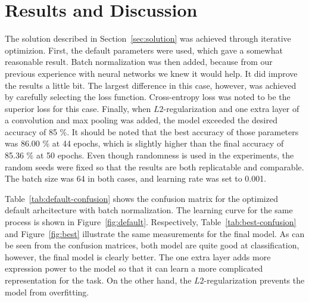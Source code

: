 \documentclass{article}
\begin{document}
\section{Results and Discussion}\label{sec:results}

The solution described in Section~\ref{sec:solution} was achieved
through iterative optimizion. First, the default parameters were used,
which gave a somewhat reasonable result. Batch normalization was then
added, because from our previous experience with neural networks we
knew it would help. It did improve the results a little bit. The
largest difference in this case, however, was achieved by carefully
selecting the loss function. Cross-entropy loss was noted to be the
superior loss for this case. Finally, when $L2$-regularization and one
extra layer of a convolution and max pooling was added, the model
exceeded the desired accuracy of 85 \%. It should be noted that the
best accuracy of those parameters was 86.00 \% at 44 epochs, which is
slightly higher than the final accuracy of 85.36 \% at 50 epochs. Even
though randomness is used in the experiments, the random seeds were
fixed so that the results are both replicatable and comparable. The
batch size was 64 in both cases, and learning rate was set to 0.001.

Table~\ref{tab:default-confusion} shows the confusion matrix for the
optimized default arhcitecture with batch normalization. The learning
curve for the same process is shown in Figure~\ref{fig:default}.
Respectively, Table~\ref{tab:best-confusion} and Figure~\ref{fig:best}
illustrate the same measurements for the final model. As can be seen
from the confusion matrices, both model are quite good at
classification, however, the final model is clearly better. The one
extra layer adds more expression power to the model so that it can
learn a more complicated representation for the task. On the other
hand, the $L2$-regularization prevents the model from overfitting.
\end{document}
